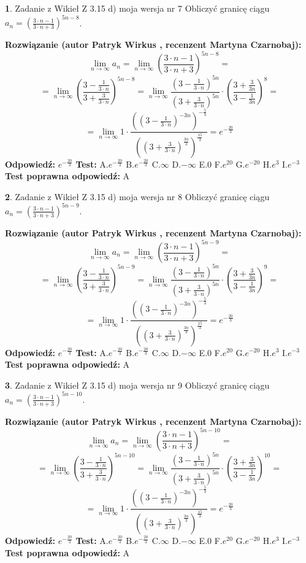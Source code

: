 \documentclass[12pt, a4paper]{article}
\theoremstyle{definition} %
\newtheorem{zad}{}
\newcommand{\zadStart}[1]{\begin{zad}#1\newline}
\newcommand{\zadStop}{\end{zad}}
\newcommand{\rozwStart}[2]{\noindent \textbf{Rozwiązanie (autor #1 , recenzent #2): }\newline}
\newcommand{\rozwStop}{\newline}
\newcommand{\odpStart}{\noindent \textbf{Odpowiedź:}\newline}
\newcommand{\odpStop}{\newline}
\newcommand{\testStart}{\noindent \textbf{Test:}\newline}
\newcommand{\testStop}{\newline}
\newcommand{\kluczStart}{\noindent \textbf{Test poprawna odpowiedź:}\newline}
\newcommand{\kluczStop}{\newline}
\begin{document}
\zadStart{Zadanie z Wikieł Z 3.15 d) moja wersja nr 7}
Obliczyć granicę ciągu $a_{n}=(\frac{3\cdot n - 1}{3 \cdot n + 3})^{5n-8}$.
\zadStop
\rozwStart{Patryk Wirkus}{Martyna Czarnobaj}
$$\lim\limits_{n\to\infty} a_{n} = \lim\limits_{n\to\infty}(\frac{3\cdot n - 1}{3 \cdot n + 3})^{5n-8}=$$
$$=\lim\limits_{n\to\infty}(\frac{3 - \frac{1}{3\cdot n}}{3 + \frac{3}{3 \cdot n}})^{5n-8}=\lim\limits_{n\to\infty}\frac{(3 - \frac{1}{3\cdot n})^{5n}}{(3 + \frac{3}{3\cdot n})^{5n}} \cdot (\frac{3+\frac{3}{3n}}{3-\frac{1}{3n}})^{8}=$$
$$=\lim\limits_{n\to\infty} 1 \cdot \frac{((3-\frac{1}{3 \cdot n})^{-3n})^{-\frac{5}{3}}}{((3+\frac{3}{3 \cdot n})^{\frac{3n}{3}})^{\frac{15}{3}}} =e^{-\frac{20}{3}}$$
\rozwStop
\odpStart
$e^{-\frac{20}{3}}$
\odpStop
\testStart
A.$ e^{-\frac{20}{3}}$
B.$ e^{-\frac{20}{3}}$
C.$\infty$
D.$-\infty$
E.$0$
F.$e^{20}$
G.$e^{-20}$
H.$e^{3}$
I.$e^{-3}$
\testStop
\kluczStart
A
\kluczStop



\zadStart{Zadanie z Wikieł Z 3.15 d) moja wersja nr 8}
Obliczyć granicę ciągu $a_{n}=(\frac{3\cdot n - 1}{3 \cdot n + 3})^{5n-9}$.
\zadStop
\rozwStart{Patryk Wirkus}{Martyna Czarnobaj}
$$\lim\limits_{n\to\infty} a_{n} = \lim\limits_{n\to\infty}(\frac{3\cdot n - 1}{3 \cdot n + 3})^{5n-9}=$$
$$=\lim\limits_{n\to\infty}(\frac{3 - \frac{1}{3\cdot n}}{3 + \frac{3}{3 \cdot n}})^{5n-9}=\lim\limits_{n\to\infty}\frac{(3 - \frac{1}{3\cdot n})^{5n}}{(3 + \frac{3}{3\cdot n})^{5n}} \cdot (\frac{3+\frac{3}{3n}}{3-\frac{1}{3n}})^{9}=$$
$$=\lim\limits_{n\to\infty} 1 \cdot \frac{((3-\frac{1}{3 \cdot n})^{-3n})^{-\frac{5}{3}}}{((3+\frac{3}{3 \cdot n})^{\frac{3n}{3}})^{\frac{15}{3}}} =e^{-\frac{20}{3}}$$
\rozwStop
\odpStart
$e^{-\frac{20}{3}}$
\odpStop
\testStart
A.$ e^{-\frac{20}{3}}$
B.$ e^{-\frac{20}{3}}$
C.$\infty$
D.$-\infty$
E.$0$
F.$e^{20}$
G.$e^{-20}$
H.$e^{3}$
I.$e^{-3}$
\testStop
\kluczStart
A
\kluczStop



\zadStart{Zadanie z Wikieł Z 3.15 d) moja wersja nr 9}
Obliczyć granicę ciągu $a_{n}=(\frac{3\cdot n - 1}{3 \cdot n + 3})^{5n-10}$.
\zadStop
\rozwStart{Patryk Wirkus}{Martyna Czarnobaj}
$$\lim\limits_{n\to\infty} a_{n} = \lim\limits_{n\to\infty}(\frac{3\cdot n - 1}{3 \cdot n + 3})^{5n-10}=$$
$$=\lim\limits_{n\to\infty}(\frac{3 - \frac{1}{3\cdot n}}{3 + \frac{3}{3 \cdot n}})^{5n-10}=\lim\limits_{n\to\infty}\frac{(3 - \frac{1}{3\cdot n})^{5n}}{(3 + \frac{3}{3\cdot n})^{5n}} \cdot (\frac{3+\frac{3}{3n}}{3-\frac{1}{3n}})^{10}=$$
$$=\lim\limits_{n\to\infty} 1 \cdot \frac{((3-\frac{1}{3 \cdot n})^{-3n})^{-\frac{5}{3}}}{((3+\frac{3}{3 \cdot n})^{\frac{3n}{3}})^{\frac{15}{3}}} =e^{-\frac{20}{3}}$$
\rozwStop
\odpStart
$e^{-\frac{20}{3}}$
\odpStop
\testStart
A.$ e^{-\frac{20}{3}}$
B.$ e^{-\frac{20}{3}}$
C.$\infty$
D.$-\infty$
E.$0$
F.$e^{20}$
G.$e^{-20}$
H.$e^{3}$
I.$e^{-3}$
\testStop
\kluczStart
A
\kluczStop
\end{document}
